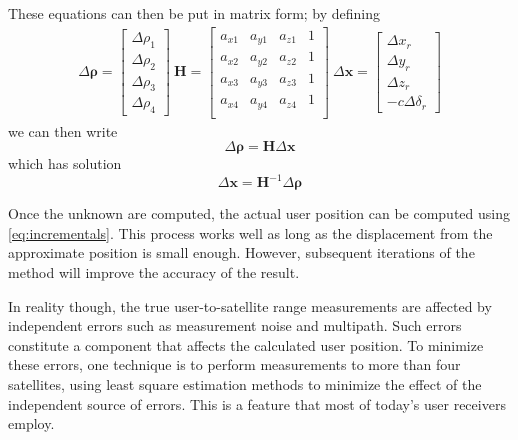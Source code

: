 These equations can then be put in matrix form; by defining
\[
  \begin{array}{l}
  \Delta \bm{\rho} = \begin{bmatrix}
    \Delta \rho_1 \\
    \Delta \rho_2 \\
    \Delta \rho_3 \\
    \Delta \rho_4
  \end{bmatrix}

  \>

  \bm{H} = \begin{bmatrix}
    a_{x1} & a_{y1} & a_{z1} & 1 \\
    a_{x2} & a_{y2} & a_{z2} & 1 \\
    a_{x3} & a_{y3} & a_{z3} & 1 \\
    a_{x4} & a_{y4} & a_{z4} & 1 \\
  \end{bmatrix}

  \>

  \Delta \bm{x} = \begin{bmatrix}
    \Delta x_r \\
    \Delta y_r \\
    \Delta z_r \\
    -c \Delta \delta_r
  \end{bmatrix}
  \end{array}
\]
we can then write
\begin{equation}
  \Delta \bm{\rho} = \bm{H} \Delta \bm{x}
\end{equation}
which has solution
\begin{equation}
  \Delta \bm{x} = \bm{H}^{-1} \Delta \bm{\rho}
\end{equation}

Once the unknown are computed, the actual user position can be computed using
\ref{eq:incrementals}. This process works well as long as the displacement from
the approximate position is small enough. However, subsequent iterations of the
method will improve the accuracy of the result.

In reality though, the true user-to-satellite range measurements are affected by
independent errors such as measurement noise and multipath. Such errors
constitute a component that affects the calculated user position. To minimize
these errors, one technique is to perform measurements to more than four
satellites, using least square estimation methods to minimize the effect of the
independent source of errors. This is a feature that most of today's user
receivers employ.
